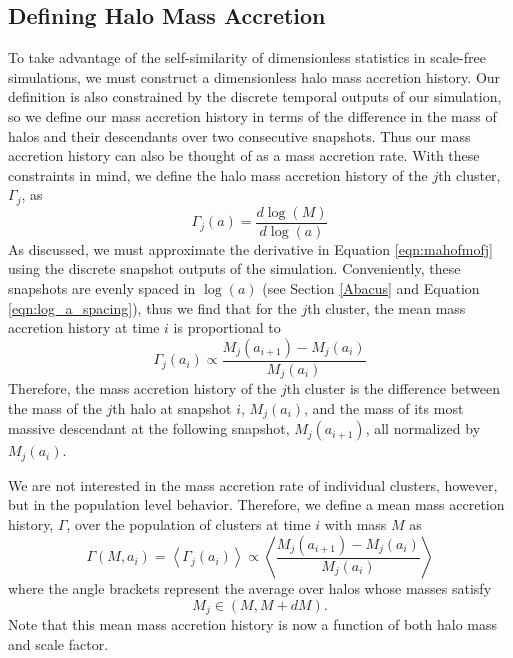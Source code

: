 \subsection{Defining Halo Mass Accretion}\label{mah_def}

To take advantage of the self-similarity of dimensionless statistics in scale-free simulations, we must construct a dimensionless halo mass accretion history. Our definition is also constrained by the discrete temporal outputs of our simulation, so we define our mass accretion history in terms of the difference in the mass of halos and their descendants over two consecutive snapshots. Thus our mass accretion history can also be thought of as a mass accretion rate. With these constraints in mind, we define the halo mass accretion history of the $j$th cluster, $\Gamma_j$, as
\begin{equation} \label{eqn:mahofmofj}%
\Gamma_j(a) = \frac{d \log(M)}{d \log(a)}
\end{equation}
As discussed, we must approximate the derivative in Equation \ref{eqn:mahofmofj} using the discrete snapshot outputs of the simulation. Conveniently, these snapshots are evenly spaced in $\log(a)$ (see Section \ref{Abacus} and Equation \ref{eqn:log_a_spacing}), thus we find that for the $j$th cluster, the mean mass accretion history at time $i$ is proportional to
\begin{equation} \label{eqn:approx_mahofmofj}
   \Gamma_j(a_i) \propto \frac{M_j(a_{i+1}) - M_j(a_{i})}{M_j(a_{i})}
\end{equation}
Therefore, the mass accretion history of the $j$th cluster is the difference between the mass of the $j$th halo at snapshot $i$, $M_j\left(a_{i}\right)$, and the mass of its most massive descendant at the following snapshot, $M_j\left(a_{i+1}\right)$, all normalized by $M_j\left(a_{i}\right)$.

We are not interested in the mass accretion rate of individual clusters, however, but in the population level behavior. Therefore, we define a mean mass accretion history, $\Gamma$, over the population of clusters at time $i$ with mass $M$ as
\begin{equation} \label{eqn:mahofm}
   \Gamma(M, a_i) = \left<\Gamma_j(a_i)\right> \propto \left<\frac{M_j(a_{i+1}) - M_j(a_{i})}{M_j(a_{i})}\right>
\end{equation}
where the angle brackets represent the average over halos whose masses satisfy
\begin{equation} \label{eqn:av_over_mahofm}
 M_j \in \left(M, M + d M\right).
\end{equation}
Note that this mean mass accretion history is now a function of both halo mass and scale factor.

